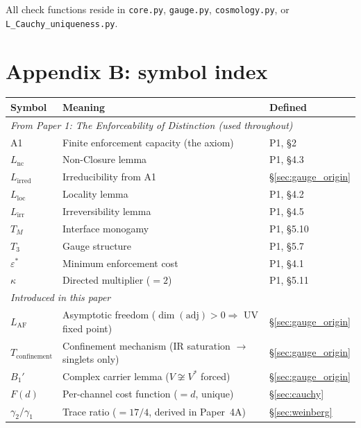 \documentclass[11pt]{article}
\begin{document}
All check functions reside in \texttt{core.py}, \texttt{gauge.py}, \texttt{cosmology.py}, or \texttt{L\_Cauchy\_uniqueness.py}.


\section{Appendix B: symbol index}
\label{app:symbols}

\begin{center}
\small
\begin{tabular}{lp{8.5cm}l}
\toprule
\textbf{Symbol} & \textbf{Meaning} & \textbf{Defined} \\
\midrule
\multicolumn{3}{l}{\textit{From Paper 1: The Enforceability of Distinction (used throughout)}} \\[2pt]
A1 & Finite enforcement capacity (the axiom) & P1, \S2 \\
$L_{\mathrm{nc}}$ & Non-Closure lemma & P1, \S4.3 \\
$L_{\mathrm{irred}}$ & Irreducibility from A1 & \S\ref{sec:gauge_origin} \\
$L_{\mathrm{loc}}$ & Locality lemma & P1, \S4.2 \\
$L_{\mathrm{irr}}$ & Irreversibility lemma & P1, \S4.5 \\
$T_M$ & Interface monogamy & P1, \S5.10 \\
$T_3$ & Gauge structure & P1, \S5.7 \\
$\varepsilon^*$ & Minimum enforcement cost & P1, \S4.1 \\
$\kappa$ & Directed multiplier ($= 2$) & P1, \S5.11 \\[4pt]
\multicolumn{3}{l}{\textit{Introduced in this paper}} \\[2pt]
$L_{\mathrm{AF}}$ & Asymptotic freedom ($\dim(\mathrm{adj}) > 0 \Rightarrow$ UV fixed point) & \S\ref{sec:gauge_origin} \\
$T_{\mathrm{confinement}}$ & Confinement mechanism (IR saturation $\to$ singlets only) & \S\ref{sec:gauge_origin} \\
$B_1'$ & Complex carrier lemma ($V \not\cong V^*$ forced) & \S\ref{sec:gauge_origin} \\
$F(d)$ & Per-channel cost function ($= d$, unique) & \S\ref{sec:cauchy} \\
$\gamma_2/\gamma_1$ & Trace ratio ($= 17/4$, derived in Paper~4A) & \S\ref{sec:weinberg} \\

\end{tabular}
\end{center}
\end{document}
